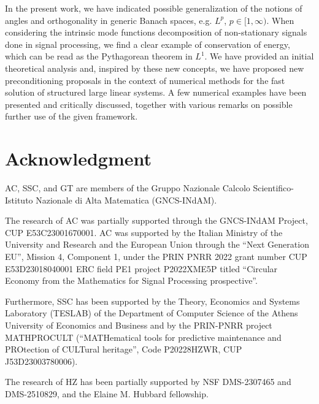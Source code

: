 \documentclass{article}
\begin{document}
In the present work, we have indicated possible generalization of the notions of angles and orthogonality in generic Banach spaces, e.g. $L^p$, $p\in [1,\infty)$. When considering the intrinsic mode functions decomposition of non-stationary signals done in signal processing, we find a clear example of conservation of energy, which can be read as the Pythagorean theorem in $L^1$. We have provided an initial theoretical analysis and, inspired by these new concepts, we have proposed new preconditioning proposals in the context of numerical methods for the fast solution of structured large linear systems. A few numerical examples have been presented and critically discussed, together with various remarks on possible further use of the given framework.

\section*{Acknowledgment}
AC, SSC, and GT are members of the Gruppo Nazionale Calcolo Scientifico-Istituto Nazionale di Alta Matematica (GNCS-INdAM).

The research of AC was partially supported through the GNCS-INdAM Project, CUP E53C23001670001. AC was supported by the Italian Ministry of the University and Research and the European Union through the ``Next Generation EU'', Mission 4, Component 1, under the PRIN PNRR 2022 grant number CUP E53D23018040001 ERC field PE1 project P2022XME5P titled ``Circular Economy from the Mathematics for Signal Processing prospective''.

Furthermore, SSC has been supported by the Theory, Economics and Systems Laboratory (TESLAB) of the Department of Computer Science of the Athens University of Economics and Business and by the PRIN-PNRR project MATHPROCULT (``MATHematical tools for predictive maintenance and PROtection of CULTural heritage'', Code P20228HZWR, CUP J53D23003780006).

The research of HZ has been partially supported by NSF DMS-2307465 and DMS-2510829, and the Elaine M. Hubbard fellowship.



\end{document}
